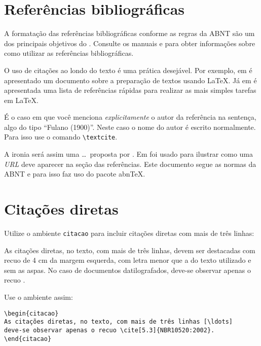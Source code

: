 \section{Referências bibliográficas}\label{sec:referencias}

A formatação das referências bibliográficas conforme as regras da ABNT são um dos principais objetivos do \abnTeX. Consulte os manuais \textcite{abntex2cite} e \textcite{abntex2cite-alf} para obter informações sobre como utilizar as referências bibliográficas.


O uso de citações ao londo do texto é uma prática desejável. Por exemplo, em \cite{lamport94} é apresentado um documento sobre a preparação de textos usando \LaTeX. Já em \cite{goossens94} é apresentada uma lista de referências rápidas para realizar as mais simples tarefas em \LaTeX.

É o caso em que você menciona \emph{explicitamente} o autor da referência na sentença, algo
do tipo ``Fulano (1900)''. Neste caso o nome do autor é escrito
normalmente. Para isso use o comando \verb+\textcite+.

A ironia será assim uma \ldots\ proposta  por \textcite{lamport94}. Em \cite{exemplo} foi usado para ilustrar como uma \textit{URL} deve aparecer na seção das referências. Este documento segue as normas da ABNT e para isso faz uso do pacote abnTeX.


\section{Citações diretas}
\label{sec-citacao}

Utilize o ambiente \texttt{citacao} para incluir
citações diretas com mais de três linhas:

\begin{citacao}
As citações diretas, no texto, com mais de três linhas, devem ser
destacadas com recuo de 4 cm da margem esquerda, com letra menor que a do texto
utilizado e sem as aspas. No caso de documentos datilografados, deve-se
observar apenas o recuo \cite[5.3]{NBR10520:2002}.
\end{citacao}

Use o ambiente assim:

\begin{verbatim}
\begin{citacao}
As citações diretas, no texto, com mais de três linhas [\ldots] 
deve-se observar apenas o recuo \cite[5.3]{NBR10520:2002}.
\end{citacao}
\end{verbatim}


